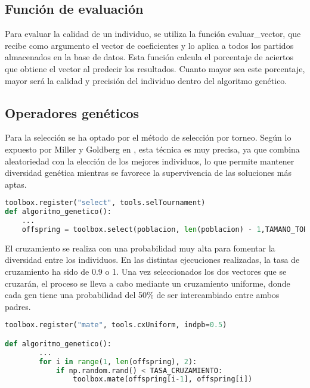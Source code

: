 \subsection*{Función de evaluación}
Para evaluar la calidad de un individuo, se utiliza la función evaluar\_vector, que recibe como argumento el vector de coeficientes y lo aplica a todos los partidos almacenados en la base de datos. Esta función calcula el porcentaje de aciertos que obtiene el vector al predecir los resultados. Cuanto mayor sea este porcentaje, mayor será la calidad y precisión del individuo dentro del algoritmo genético.

\subsection*{Operadores genéticos}

Para la selección se ha optado por el método de selección por torneo. Según lo expuesto por Miller y Goldberg en \cite{algoritmo_genetico}, esta técnica es muy precisa, ya que combina aleatoriedad con la elección de los mejores individuos, lo que permite mantener diversidad genética mientras se favorece la supervivencia de las soluciones más aptas.

\begin{lstlisting}[language=Python, caption={Selección por torneo}, label={lst:codigo-python}]
toolbox.register("select", tools.selTournament)
def algoritmo_genetico():
    ...
    offspring = toolbox.select(poblacion, len(poblacion) - 1,TAMANO_TORNEO)

\end{lstlisting}

El cruzamiento se realiza con una probabilidad muy alta para fomentar la diversidad entre los individuos. En las distintas ejecuciones realizadas, la tasa de cruzamiento ha sido de 0.9 o 1. Una vez seleccionados los dos vectores que se cruzarán, el proceso se lleva a cabo mediante un cruzamiento uniforme, donde cada gen tiene una probabilidad del 50\% de ser intercambiado entre ambos padres.

\begin{lstlisting}[language=Python, caption={Cruzamiento}, label={lst:codigo-python}]
toolbox.register("mate", tools.cxUniform, indpb=0.5)

def algoritmo_genetico():
        ...
        for i in range(1, len(offspring), 2):
            if np.random.rand() < TASA_CRUZAMIENTO:
                toolbox.mate(offspring[i-1], offspring[i])
\end{lstlisting}

